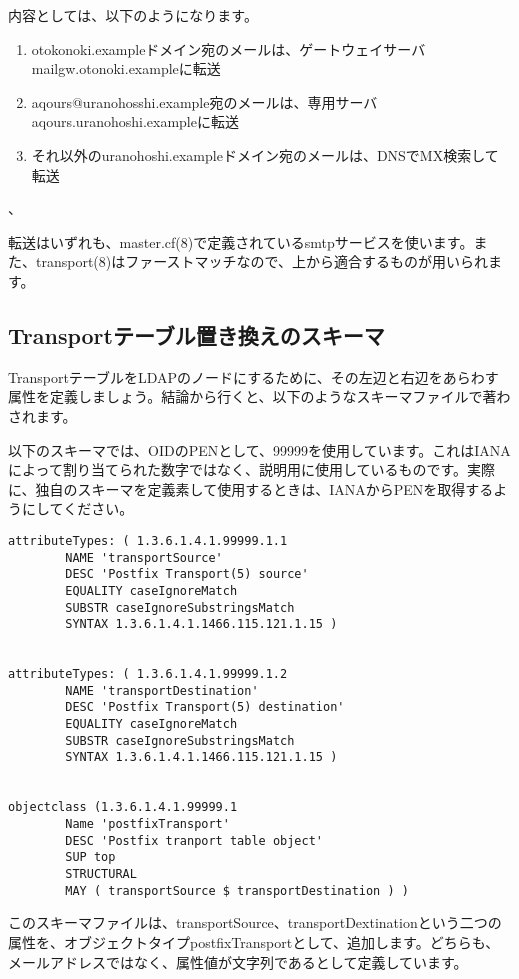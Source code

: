 内容としては、以下のようになります。

\begin{enumerate}
  \item otokonoki.exampleドメイン宛のメールは、ゲートウェイサーバmailgw.otonoki.exampleに転送
  \item aqours@uranohosshi.example宛のメールは、専用サーバaqours.uranohoshi.exampleに転送
  \item それ以外のuranohoshi.exampleドメイン宛のメールは、DNSでMX検索して転送
\end{enumerate}、

転送はいずれも、master.cf(8)で定義されているsmtpサービスを使います。また、transport(8)はファーストマッチなので、上から適合するものが用いられます。

\subsection{Transportテーブル置き換えのスキーマ}
TransportテーブルをLDAPのノードにするために、その左辺と右辺をあらわす属性を定義しましょう。結論から行くと、以下のようなスキーマファイルで著わされます。

以下のスキーマでは、OIDのPENとして、99999を使用しています。これはIANAによって割り当てられた数字ではなく、説明用に使用しているものです。実際に、独自のスキーマを定義素して使用するときは、IANAからPENを取得するようにしてください。

\begin{verbatim}
attributeTypes: ( 1.3.6.1.4.1.99999.1.1
        NAME 'transportSource'
        DESC 'Postfix Transport(5) source'
        EQUALITY caseIgnoreMatch
        SUBSTR caseIgnoreSubstringsMatch
        SYNTAX 1.3.6.1.4.1.1466.115.121.1.15 )


attributeTypes: ( 1.3.6.1.4.1.99999.1.2
        NAME 'transportDestination'
        DESC 'Postfix Transport(5) destination'
        EQUALITY caseIgnoreMatch
        SUBSTR caseIgnoreSubstringsMatch
        SYNTAX 1.3.6.1.4.1.1466.115.121.1.15 )


objectclass (1.3.6.1.4.1.99999.1
        Name 'postfixTransport'
        DESC 'Postfix tranport table object'
        SUP top
        STRUCTURAL
        MAY ( transportSource $ transportDestination ) )
\end{verbatim}

このスキーマファイルは、transportSource、transportDextinationという二つの属性を、オブジェクトタイプpostfixTransportとして、追加します。どちらも、メールアドレスではなく、属性値が文字列であるとして定義しています。

